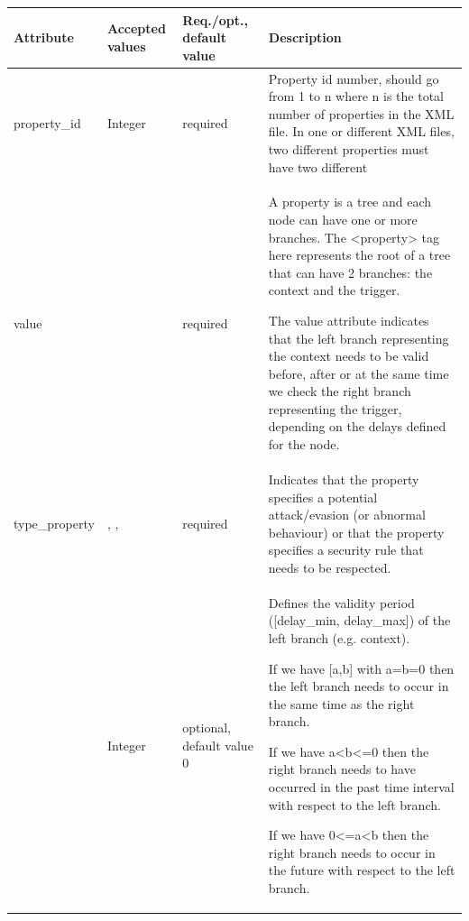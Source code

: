 \begin{table}[H]
\label{prop_att}
    \begin{adjustwidth}{-2in}{-.5in}
        \begin{center}
\begin{supertabular}{|m{1.0281599in}|m{1.0281599in}|m{1.0281599in}|m{3.44206in}|}
\hline
{}
 Attribute &
Accepted values &
Req./opt., default value &
Description
\\\hline
property\_id &
Integer &
required &
Property id number, should go from 1 to n where n is the total number of
properties in the XML file. In one or different XML files, two different properties must have two different \\\hline
value &
&
required &
A property is a tree and each node can have one or more branches. The
{\textless}property{\textgreater} tag here represents the root of a
tree that can have 2 branches: the context and the trigger.

The value attribute indicates that the left
branch representing the context needs to be valid before, after or at the same time we check the
right branch representing the trigger, depending on the delays defined for the node.
\\\hline
type\_property &
,
,
&
required &
Indicates that the property specifies a potential attack/evasion (or abnormal
behaviour) or that the property specifies a security rule that needs to
be respected.\\\hline
{} &
Integer &
optional, default value 0 &
Defines the validity period ([delay\_min, delay\_max]) of the left branch
(e.g. context). 

If we have [a,b] with a=b=0 then the left branch needs to occur in the
same time as the right branch. 

If we have a{\textless}b{\textless}=0 then the right branch needs to
have occurred in the past time interval with respect to the left
branch. 

If we have 0{\textless}=a{\textless}b then the right branch needs to
occur in the future with respect to the left branch. 


\end{supertabular}
\end{center}
\end{adjustwidth}
\end{table}
